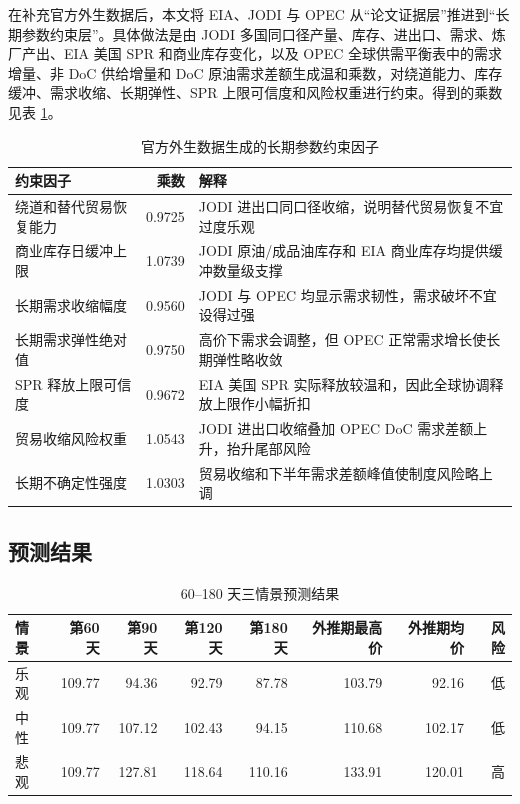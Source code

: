 在补充官方外生数据后，本文将 EIA、JODI 与 OPEC 从“论文证据层”推进到“长期参数约束层”。具体做法是由 JODI 多国同口径产量、库存、进出口、需求、炼厂产出、EIA 美国 SPR 和商业库存变化，以及 OPEC 全球供需平衡表中的需求增量、非 DoC 供给增量和 DoC 原油需求差额生成温和乘数，对绕道能力、库存缓冲、需求收缩、长期弹性、SPR 上限可信度和风险权重进行约束。得到的乘数见表 \ref{tab:official-factor-multipliers}。

\begin{table}[htbp]
\centering
\caption{官方外生数据生成的长期参数约束因子}
\label{tab:official-factor-multipliers}
\begin{tabularx}{\linewidth}{l r X}
\toprule
约束因子 & 乘数 & 解释 \\
\midrule
绕道和替代贸易恢复能力 & 0.9725 & JODI 进出口同口径收缩，说明替代贸易恢复不宜过度乐观 \\
商业库存日缓冲上限 & 1.0739 & JODI 原油/成品油库存和 EIA 商业库存均提供缓冲数量级支撑 \\
长期需求收缩幅度 & 0.9560 & JODI 与 OPEC 均显示需求韧性，需求破坏不宜设得过强 \\
长期需求弹性绝对值 & 0.9750 & 高价下需求会调整，但 OPEC 正常需求增长使长期弹性略收敛 \\
SPR 释放上限可信度 & 0.9672 & EIA 美国 SPR 实际释放较温和，因此全球协调释放上限作小幅折扣 \\
贸易收缩风险权重 & 1.0543 & JODI 进出口收缩叠加 OPEC DoC 需求差额上升，抬升尾部风险 \\
长期不确定性强度 & 1.0303 & 贸易收缩和下半年需求差额峰值使制度风险略上调 \\
\bottomrule
\end{tabularx}
\end{table}

\subsection{预测结果}

\begin{table}[htbp]
\centering
\caption{60--180 天三情景预测结果}
\begin{tabular}{lrrrrrrr}
\toprule
情景 & 第60天 & 第90天 & 第120天 & 第180天 & 外推期最高价 & 外推期均价 & 风险 \\
\midrule
乐观 & 109.77 & 94.36 & 92.79 & 87.78 & 103.79 & 92.16 & 低 \\
中性 & 109.77 & 107.12 & 102.43 & 94.15 & 110.68 & 102.17 & 低 \\
悲观 & 109.77 & 127.81 & 118.64 & 110.16 & 133.91 & 120.01 & 高 \\
\bottomrule
\end{tabular}
\end{table}

